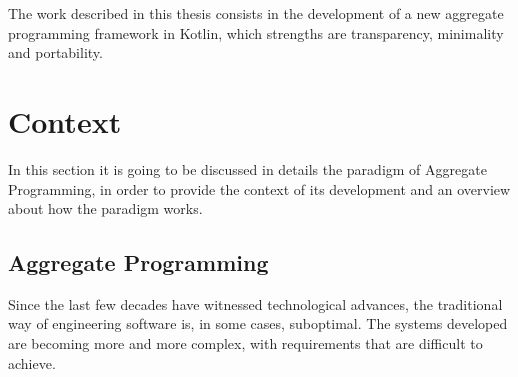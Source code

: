 The work described in this thesis consists in the development of a new aggregate programming framework in Kotlin, which strengths are transparency, minimality and portability. 

\section{Context}
In this section it is going to be discussed in details the paradigm of Aggregate Programming, in order to provide the context of its development and an overview about how the paradigm works.

\subsection{Aggregate Programming}
Since the last few decades have witnessed technological advances, the traditional way of engineering software is, in some cases, suboptimal.
The systems developed are becoming more and more complex, with requirements that are difficult to achieve. 

